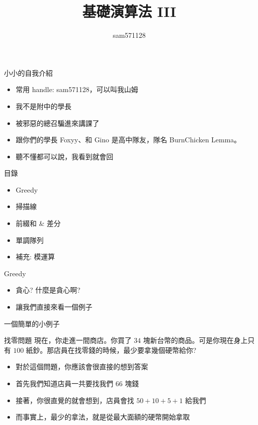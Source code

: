 \documentclass[aspectratio=169]{beamer}
\title{基礎演算法 III}
\author{sam571128}
\date[附中延平競程讀書會]
\begin{document}
    \begin{frame}
        \titlepage
    \end{frame}
    
    \begin{frame}{小小的自我介紹}
        \begin{itemize}
            \item 常用 handle: sam571128，可以叫我山姆
            \item 我不是附中的學長
            \item 被邪惡的總召騙進來講課了
            \item 跟你們的學長 Foxyy、和 Gino 是高中隊友，隊名 BurnChicken Lemma。 
            \item 聽不懂都可以說，我看到就會回
        \end{itemize}
    \end{frame}
    
    \begin{frame}{目錄}
        \begin{itemize}
            \item Greedy
            \item 掃描線
            \item 前綴和 \& 差分
            \item 單調隊列
            \item 補充: 模運算
        \end{itemize}
    \end{frame}
    
    \begin{frame}{Greedy}
        \begin{itemize}
            \item 貪心? 什麼是貪心啊?
            \item 讓我們直接來看一個例子
        \end{itemize}
    \end{frame}
    
    \begin{frame}{一個簡單的小例子}
        \begin{block}{找零問題}
            現在，你走進一間商店。你買了 $34$ 塊新台幣的商品。可是你現在身上只有 $100$ 紙鈔。那店員在找零錢的時候，最少要拿幾個硬幣給你?
        \end{block}
        \begin{itemize}
            \item 對於這個問題，你應該會很直接的想到答案
            \item<2-> 首先我們知道店員一共要找我們 $66$ 塊錢
            \item<2-> 接著，你很直覺的就會想到，店員會找 $50 + 10 + 5 + 1$ 給我們
            \item<3-> 而事實上，最少的拿法，就是從最大面額的硬幣開始拿取
        \end{itemize}
    \end{frame}
    
\end{document}
